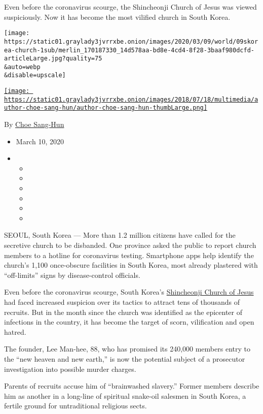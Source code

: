 Even before the coronavirus scourge, the Shincheonji Church of Jesus was
viewed suspiciously. Now it has become the most vilified church in South
Korea.

\texttt{[image: https://static01.graylady3jvrrxbe.onion/images/2020/03/09/world/09skorea-church-1sub/merlin\_170187330\_14d578aa-bd8e-4cd4-8f28-3baaf980dcfd-articleLarge.jpg?quality=75\\\&auto=webp\\\&disable=upscale]}

\href{https://www.nytimes3xbfgragh.onion/by/choe-sang-hun}{\texttt{[image: https://static01.graylady3jvrrxbe.onion/images/2018/07/18/multimedia/author-choe-sang-hun/author-choe-sang-hun-thumbLarge.png]}}

By \href{https://www.nytimes3xbfgragh.onion/by/choe-sang-hun}{Choe
Sang-Hun}

\begin{itemize}
\item
  March 10, 2020
\item
  \begin{itemize}
  \item
  \item
  \item
  \item
  \item
  \item
  \end{itemize}
\end{itemize}

SEOUL, South Korea --- More than 1.2 million citizens have called for
the secretive church to be disbanded. One province asked the public to
report church members to a hotline for coronavirus testing. Smartphone
apps help identify the church's 1,100 once-obscure facilities in South
Korea, most already plastered with ``off-limits'' signs by
disease-control officials.

Even before the coronavirus scourge, South Korea's
\href{https://www.nytimes3xbfgragh.onion/2020/02/21/world/asia/south-korea-coronavirus-shincheonji.html}{Shincheonji
Church of Jesus} had faced increased suspicion over its tactics to
attract tens of thousands of recruits. But in the month since the church
was identified as the epicenter of infections in the country, it has
become the target of scorn, vilification and open hatred.

The founder, Lee Man-hee, 88, who has promised its 240,000 members entry
to the ``new heaven and new earth,'' is now the potential subject of a
prosecutor investigation into possible murder charges.

Parents of recruits accuse him of ``brainwashed slavery.'' Former
members describe him as another in a long-line of spiritual snake-oil
salesmen in South Korea, a fertile ground for untraditional religious
sects.

